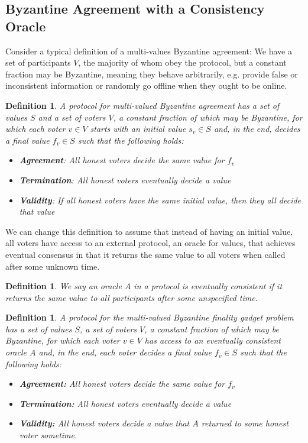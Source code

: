 \documentclass{article}
\newtheorem{definition}[theorem]{Definition}
\begin{document}
\subsection{Byzantine Agreement with a Consistency Oracle}
Consider a typical definition of a multi-values Byzantine agreement: 
We have a set of participants $V$, the majority of whom obey the protocol, but a constant fraction may be Byzantine, meaning they behave arbitrarily, e.g. provide false or inconsistent information or randomly go offline when they ought to be online.

\begin{definition} A protocol for {\em multi-valued Byzantine agreement} has a set of values $S$ and a set of voters $V$, a constant fraction of which may be Byzantine, for which each voter $v \in V$ starts with an initial value $s_v \in S$ and, in the end, decides a final value $f_v \in S$ such that the following holds:

\begin{itemize}
\item {\bf Agreement}: All honest voters decide the same value for $f_v$
\item {\bf Termination}: All honest voters eventually decide a value
\item {\bf Validity}: If all honest voters have the same initial value, then they all decide that value
\end{itemize}

\end{definition}

We can change this definition to assume that instead of having an initial value, all voters have access to an external protocol, an oracle for values, that achieves eventual consensus in that it returns the same value to all voters when called after some unknown time.

\begin{definition}
We say an oracle $A$ in a protocol is {\em eventually consistent} if it returns the same value to all participants after some unspecified time.
\end{definition}


\begin{definition} A protocol for the {\em multi-valued Byzantine finality gadget problem} has a set of values $S$, a set of voters $V$, a constant fraction of which may be Byzantine, for which each voter $v \in V$ has access to an eventually consistent oracle $A$ and, in the end, each voter decides a final value $f_v \in S$ such that the following holds:

\begin{itemize}
\item {\bf Agreement:} All honest voters decide the same value for $f_v$
\item {\bf Termination:} All honest voters eventually decide a value
\item {\bf Validity:} All honest voters decide a value that $A$ returned to some honest voter sometime.
\end{itemize}

\end{definition}
\end{document}
